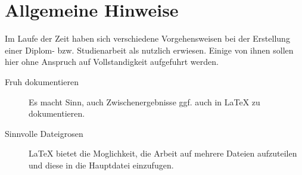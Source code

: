 

\section{Allgemeine Hinweise}

Im Laufe der Zeit haben sich verschiedene Vorgehensweisen bei der Erstellung einer Diplom- bzw.
Studienarbeit als nutzlich erwiesen. Einige von ihnen sollen hier ohne Anspruch auf Vollstandigkeit
aufgefuhrt werden.

\begin{description}
      \item[Fruh dokumentieren]
            Es macht Sinn, auch Zwischenergebnisse ggf. auch in \LaTeX{} zu dokumentieren.

      \item[Sinnvolle Dateigrosen]
            \LaTeX{} bietet die Moglichkeit, die Arbeit auf mehrere Dateien aufzuteilen und diese in die
            Hauptdatei einzufugen.
\end{description}

